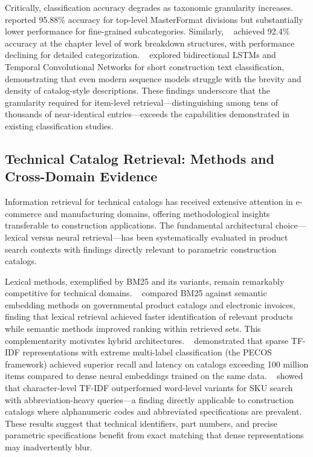 \documentclass[preprint,12pt]{elsarticle}
\begin{document}
Critically, classification accuracy degrades as taxonomic granularity increases. ~\cite{caldasAutomatingHierarchicalDocument2003} reported 95.88\% accuracy for top-level MasterFormat divisions but substantially lower performance for fine-grained subcategories. Similarly, ~\cite{martinez-rojasApproachAutomaticClassification2015} achieved 92.4\% accuracy at the chapter level of work breakdown structures, with performance declining for detailed categorization. ~\cite{dezaMachineLearningApproach2022} explored bidirectional LSTMs and Temporal Convolutional Networks for short construction text classification, demonstrating that even modern sequence models struggle with the brevity and density of catalog-style descriptions. These findings underscore that the granularity required for item-level retrieval—distinguishing among tens of thousands of near-identical entries—exceeds the capabilities demonstrated in existing classification studies.

\subsection{Technical Catalog Retrieval: Methods and Cross-Domain Evidence}

Information retrieval for technical catalogs has received extensive attention in e-commerce and manufacturing domains, offering methodological insights transferable to construction applications. The fundamental architectural choice—lexical versus neural retrieval—has been systematically evaluated in product search contexts with findings directly relevant to parametric construction catalogs.

Lexical methods, exemplified by BM25 and its variants, remain remarkably competitive for technical domains. ~\cite{mendesComparativeStudyLexical2025} compared BM25 against semantic embedding methods on governmental product catalogs and electronic invoices, finding that lexical retrieval achieved faster identification of relevant products while semantic methods improved ranking within retrieved sets. This complementarity motivates hybrid architectures. ~\cite{changExtremeMultilabelLearning2021} demonstrated that sparse TF-IDF representations with extreme multi-label classification (the PECOS framework) achieved superior recall and latency on catalogs exceeding 100 million items compared to dense neural embeddings trained on the same data. ~\cite{ubrangalaSearchingFastSlow2024} showed that character-level TF-IDF outperformed word-level variants for SKU search with abbreviation-heavy queries—a finding directly applicable to construction catalogs where alphanumeric codes and abbreviated specifications are prevalent. These results suggest that technical identifiers, part numbers, and precise parametric specifications benefit from exact matching that dense representations may inadvertently blur.
\end{document}
